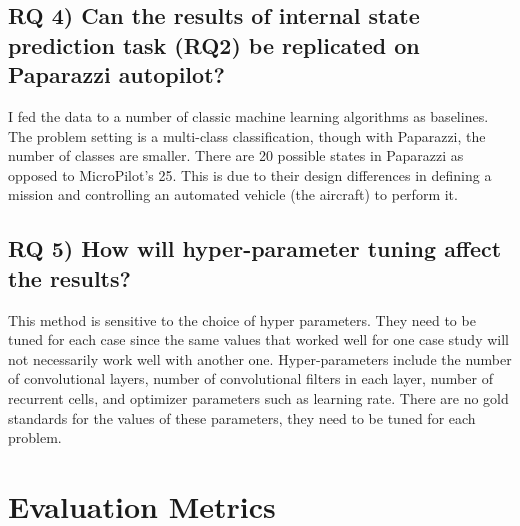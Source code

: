 \subsection{RQ 4) Can the results of internal state prediction task (RQ2) be replicated on Paparazzi autopilot?}
I fed the data to a number of classic machine learning algorithms as baselines. The problem setting is a multi-class classification, though with Paparazzi, the number of classes are smaller. 
There are 20 possible states in Paparazzi as opposed to MicroPilot's 25. This is due to their design differences in defining a mission and controlling an automated vehicle (the aircraft) to perform it.

\subsection{RQ 5) How will hyper-parameter tuning affect the results?}
This method is sensitive to the choice of hyper parameters. They need to be tuned for each case since the same values that worked well for one case study will not necessarily work well with another one. Hyper-parameters include the number of convolutional layers, number of convolutional filters in each layer, number of recurrent cells, and optimizer parameters such as learning rate. There are no gold standards for the values of these parameters, they need to be tuned for each problem. %

\section{Evaluation Metrics}

